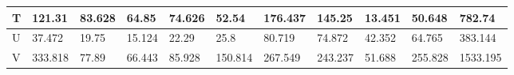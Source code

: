 \begin{landscape}
\begin{longtable}[c]{|l|llllllllll|}
  T                                                                               & \multicolumn{1}{l|}{121.31}                                                         & \multicolumn{1}{l|}{83.628}                                                         & \multicolumn{1}{l|}{64.85}                                                          & \multicolumn{1}{l|}{74.626}                                                         & \multicolumn{1}{l|}{52.54}                                                          & \multicolumn{1}{l|}{176.437}                                                        & \multicolumn{1}{l|}{145.25}                                    & \multicolumn{1}{l|}{13.451}                                    & \multicolumn{1}{l|}{50.648}                                        & 782.74                                                                                 \\ \hline
  U                                                                               & \multicolumn{1}{l|}{37.472}                                                         & \multicolumn{1}{l|}{19.75}                                                          & \multicolumn{1}{l|}{15.124}                                                         & \multicolumn{1}{l|}{22.29}                                                          & \multicolumn{1}{l|}{25.8}                                                           & \multicolumn{1}{l|}{80.719}                                                         & \multicolumn{1}{l|}{74.872}                                    & \multicolumn{1}{l|}{42.352}                                    & \multicolumn{1}{l|}{64.765}                                        & 383.144                                                                                \\ \hline
  V                                                                               & \multicolumn{1}{l|}{333.818}                                                        & \multicolumn{1}{l|}{77.89}                                                          & \multicolumn{1}{l|}{66.443}                                                         & \multicolumn{1}{l|}{85.928}                                                         & \multicolumn{1}{l|}{150.814}                                                        & \multicolumn{1}{l|}{267.549}                                                        & \multicolumn{1}{l|}{243.237}                                   & \multicolumn{1}{l|}{51.688}                                    & \multicolumn{1}{l|}{255.828}                                       & 1533.195                                                                               \\ \hline

\end{longtable}
\end{landscape}
